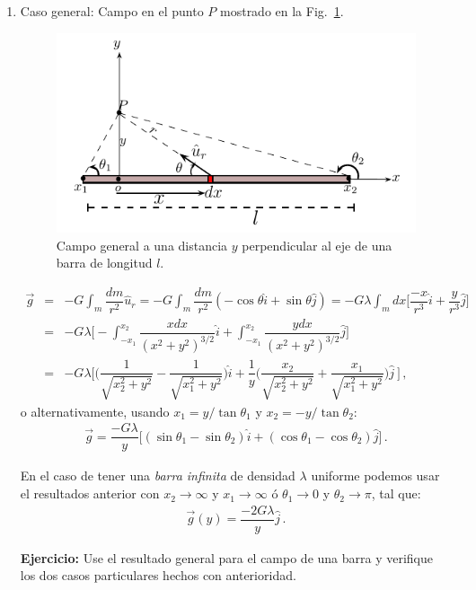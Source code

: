 \begin{enumerate}
\item Caso general: Campo en el punto $P$ mostrado en la Fig.~\ref{fig:gravitacion-barra3}.
\begin{figure}[h]
\begin{center}
\includegraphics[scale=1.2]{gravitacion/barra3}
\end{center}
\caption{Campo general a una distancia $y$ perpendicular al eje de una barra de longitud $l$.}
\label{fig:gravitacion-barra3}
\end{figure}
%
\begin{eqnarray}
\nonumber
\vec{g}&=&-G\int_m \dfrac{dm}{r^2}\hat{u}_r =-G\int_m \dfrac{dm}{r^2} (-\cos\theta \hat{i}+\sin\theta\hat{j}) = -G \lambda \int_m dx \bigg[\dfrac{-x}{r^3}\hat{i}+ \dfrac{y}{r^3}\hat{j}\bigg]\\ \nonumber
&=&-G \lambda \bigg[-\int_{-x_1}^{x_2}\dfrac{x dx}{(x^2+y^2)^{3/2}} \hat{i}+\int_{-x_1}^{x_2}\dfrac{ydx}{(x^2+y^2)^{3/2}}\hat{j}  \bigg] \\ 
&=&-G \lambda \Bigg[\bigg(\dfrac{1}{\sqrt{x_2^2+y^2} }-\dfrac{1}{\sqrt{x_1^2+y^2} } \bigg)\hat{i} + \dfrac{1}{y} \bigg(\dfrac{x_2}{\sqrt{x_2^2+y^2} }+\dfrac{x_1}{\sqrt{x_1^2+y^2} } \bigg)\hat{j} \ \Bigg] \,,
\end{eqnarray}
o alternativamente, usando $x_1=y/\tan\theta_1$ y $x_2=-y/\tan\theta_2$:
\begin{eqnarray}
\vec{g}=\dfrac{-G \lambda }{y}\bigg[(\sin\theta_1 -\sin\theta_2)\hat{i}+(\cos\theta_1 -\cos\theta_2)\hat{j}\bigg]\,.
\end{eqnarray}

En el caso de tener una \textit{barra infinita} de densidad $\lambda$ uniforme podemos usar el resultados anterior con $x_2 \rightarrow \infty$ y $x_1 \rightarrow \infty$ ó $\theta_1 \rightarrow 0$ y $\theta_2 \rightarrow \pi$, tal que:
%
\begin{eqnarray}
\vec{g}(y)=\dfrac{-2G\lambda}{y}\hat{j}\,.
\end{eqnarray}

\textbf{Ejercicio:} Use el resultado general para el campo de una barra y verifique los dos casos particulares hechos con anterioridad.

\end{enumerate}



